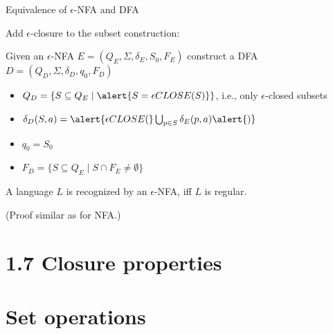 \documentclass[handout]{beamer}
\begin{document}
\begin{frame}{Equivalence of $\epsilon$-NFA and DFA}

    Add $\epsilon$-closure to the subset construction: 
    
    Given an $\epsilon$-NFA $E=(Q_E,\Sigma,\delta_E,S_0,F_E)$ construct a DFA $D=(Q_D,\Sigma,\delta_D,q_0,F_D)$

    \begin{itemize}
        \item $Q_D=\{S\subseteq Q_E\mid \alert{S=\epsilon CLOSE(S)}\}$, i.e., only \alert{$\epsilon$-closed} subsets
        \item $\delta_D(S,a)=\alert{\epsilon CLOSE(}\bigcup_{p \in S}\delta_E(p,a)\alert{)}$
        \item $q_0=S_0$
        \item $F_D=\{S\subseteq Q_E \mid S \cap F_E \neq \emptyset\}$
    \end{itemize}

    \begin{theorem}
        A language $L$ is recognized by an $\epsilon$-NFA, iff $L$ is regular.
    \end{theorem}    
    (Proof similar as for NFA.)

\end{frame}


\section{1.7 Closure properties}


\section{Set operations}
\end{document}
